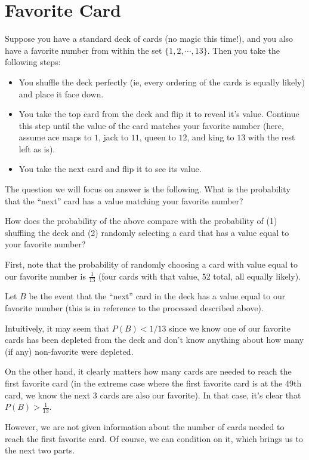 \documentclass[11pt]{article}
\begin{document}
\section*{Favorite Card}
Suppose you have a standard deck of cards (no magic this time!), and you also have a favorite number from within the set $\{1,2,\cdots,13\}$. Then you take the following steps:
\begin{itemize}
\item You shuffle the deck perfectly (ie, every ordering of the cards is equally likely) and place it face down.
\item You take the top card from the deck and flip it to reveal it's value. Continue this step until the value of the card matches your favorite number (here, assume ace maps to $1$, jack to $11$, queen to $12$, and king to $13$ with the rest left as is).
\item You take the next card and flip it to see its value.
\end{itemize}
The question we will focus on answer is the following. What is the probability that the ``next'' card has a value matching your favorite number?

\begin{exercise}[Intuition]
How does the probability of the above compare with the probability of (1) shuffling the deck and (2) randomly selecting a card that has a value equal to your favorite number?
\end{exercise}
\begin{solution}
First,  note that the probability of randomly choosing a card with value equal to our favorite number is $\frac{1}{13}$ (four cards with that value, 52 total, all equally likely).

Let $B$ be the event that the ``next'' card in the deck has a value equal to our favorite number (this is in reference to the processed described above).

Intuitively, it may seem that $P (B) < 1/13$ since we know one of our favorite cards has been depleted from the deck and don't know anything about how many (if any) non-favorite were depleted.

On the other hand, it clearly matters how many cards are needed to reach the first favorite card (in the extreme case where the first favorite card is at the 49th card, we know the next 3 cards are also our favorite). In that case, it's clear that $P(B) > \frac{1}{13}$.

However, we are not given information about the number of cards needed to reach the first favorite card. Of course, we can condition on it, which brings us to the next two parts.
\end{solution}
\end{document}
